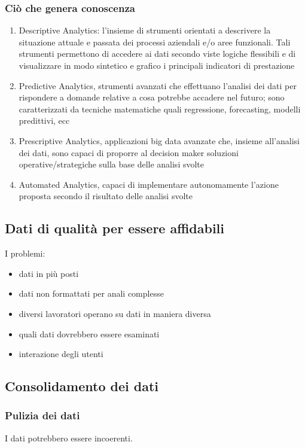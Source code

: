 \subsubsection{Ciò che genera conoscenza}
\begin{enumerate}
    \item Descriptive Analytics: l’insieme di strumenti orientati a descrivere la
    situazione attuale e passata dei processi aziendali e/o aree funzionali. Tali
    strumenti permettono di accedere ai dati secondo viste logiche flessibili e
    di visualizzare in modo sintetico e grafico i principali indicatori di
    prestazione
    \item Predictive Analytics, strumenti avanzati che effettuano l’analisi dei dati
    per rispondere a domande relative a cosa potrebbe accadere nel futuro;
    sono caratterizzati da tecniche matematiche quali regressione, forecasting,
    modelli predittivi, ecc
    \item Prescriptive Analytics, applicazioni big data avanzate che, insieme
    all’analisi dei dati, sono capaci di proporre al decision maker soluzioni
    operative/strategiche sulla base delle analisi svolte
    \item Automated Analytics, capaci di implementare autonomamente l’azione
    proposta secondo il risultato delle analisi svolte
\end{enumerate}

\subsection{Dati di qualità per essere affidabili}

I problemi:
\begin{itemize}
    \item dati in più posti
    \item dati non formattati per anali complesse
    \item diversi lavoratori operano su dati in maniera diversa
    \item quali dati dovrebbero essere esaminati
    \item interazione degli utenti
\end{itemize}

\subsection{Consolidamento dei dati}

\subsubsection{Pulizia dei dati}
I dati potrebbero essere incoerenti.
